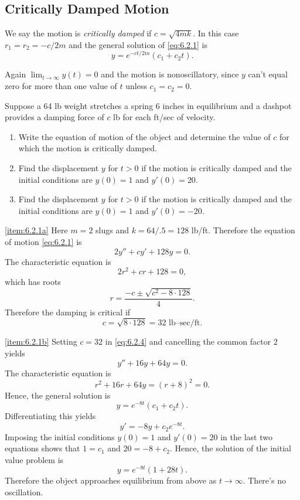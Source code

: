 \documentclass{ximera}
\begin{document}
\subsection*{Critically Damped Motion}
 
We say the motion is \textit{critically damped} if $c=\sqrt{4mk}$. In
this case $r_1=r_2=-c/2m$ and the general solution of \eqref{eq:6.2.1} is
$$
y=e^{-ct/2m}(c_1+c_2t).
$$
 
Again $\lim_{t\rightarrow\infty}y(t)=0$ and the motion is nonoscillatory,
since $y$ can't equal zero for more than one value of $t$ unless
$c_1=c_2=0$. %
 
\begin{example}\label{example:6.2.1}
Suppose a 64 lb weight stretches a spring 6 inches in equilibrium
and a dashpot provides a damping force of $c$ lb for each ft/sec of
velocity.
\begin{enumerate}
\item\label{item:6.2.1a} %
 Write the equation of motion of the object and determine the value of
$c$ for which the motion is critically damped.
\item\label{item:6.2.1b} %
 Find the displacement $y$ for $t>0$ if the motion is critically damped
and the initial conditions are $y(0)=1$ and $y'(0)=20$.
\item\label{item:6.2.1c} %
 Find the displacement $y$ for $t>0$ if the motion is critically damped
and the initial conditions are $y(0)=1$ and $y'(0)=-20$.
\end{enumerate}
 
\begin{explanation}\ref{item:6.2.1a}  Here $m=2$ slugs and $k=64/.5=128$
lb/ft. Therefore the equation of motion  \eqref{eq:6.2.1} is
\begin{equation}\label{eq:6.2.4}
2y''+cy'+128y=0.
\end{equation}
The characteristic equation  is
$$
2r^2+cr+128=0,
$$
which has  roots
$$
r=\frac{-c\pm\sqrt{c^2-8\cdot128}}{4}.
$$
Therefore the damping is critical if
$$
c=\sqrt{8\cdot128}=32\mbox{ lb--sec/ft}.
$$
 
\ref{item:6.2.1b}
 Setting $c=32$ in  \eqref{eq:6.2.4} and cancelling the common factor $2$
yields
$$
y''+16y+64y=0.
$$
The characteristic equation  is
$$
r^2+16r+64y=(r+8)^2=0.
$$
Hence, the general solution is
\begin{equation}\label{eq:6.2.5}
y=e^{-8t}(c_1+c_2t).
\end{equation}
 Differentiating this yields
\begin{equation}\label{eq:6.2.6}
y'=-8y+c_2e^{-8t}.
\end{equation}
Imposing the initial conditions $y(0)=1$ and $y'(0)=20$ in the last
two equations shows that $1=c_1$ and $20=-8+c_2$. Hence, the solution
of the initial value problem is
$$
y=e^{-8t}(1+28t).
$$
Therefore the object approaches equilibrium from above as
$t\rightarrow\infty$. There's no oscillation.
 

\end{explanation}
\end{example}
\end{document}
